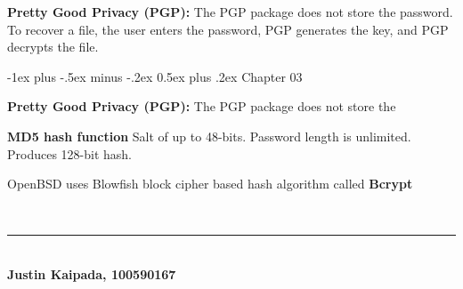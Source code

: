 \documentclass[10pt,landscape]{article}
\makeatletter
\renewcommand{\section}{\@startsection{section}{1}{0mm}%
    {-1ex plus -.5ex minus -.2ex}%
    {0.5ex plus .2ex}%
    {\normalfont\large\bfseries}}
\makeatother
\begin{document}
\begin{multicols}{3}
\textbf{Pretty Good Privacy (PGP):} The PGP package does not store the
password. To recover a file, the user enters the password, PGP
generates the key, and PGP decrypts the file.

\section{Chapter 03}


\textbf{Pretty Good Privacy (PGP):} The PGP package does not store the

\textbf{MD5 hash function} Salt of up to 48-bits.  Password length is unlimited.  Produces 128-bit
hash.

OpenBSD uses Blowfish block cipher based hash algorithm called \textbf{Bcrypt}

~\\

\vfill
\hrule
~\\
\large{\textbf{Justin Kaipada, 100590167}}
\end{multicols}
\end{document}
